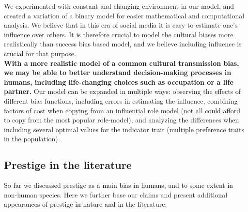 \documentclass[11pt]{article}
\begin{document}
We experimented with constant and changing environment in our model, and created a variation of a binary model for easier mathematical and computational analysis.
We believe that in this era of social media it is easy to estimate one's influence over others.
It is therefore crucial to model the cultural biases more realistically than success bias based model, and we believe including influence is crucial for that purpose.\\
\textbf{With a more realistic model of a common cultural transmission bias, we may be able to better understand decision-making processes in humans, including life-changing choices such as occupation or a life partner.} 
Our model can be expanded in multiple ways: observing the effects of different bias functions, including errors in estimating the influence, combining factors of cost when copying from an influential role model (not all could afford to copy from the most popular role-model), and analyzing the differences when including several optimal values for the indicator trait (multiple preference traits in the population).

\subsection{Prestige in the literature}
So far we discussed prestige as a main bias in humans, and to some extent in non-human species. Here we further base our claims and present additional appearances of prestige in nature and in the literature. \\
\end{document}
